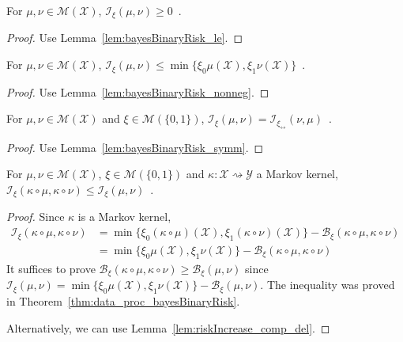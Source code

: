 \begin{lemma}
  \label{lem:statInfo_nonneg}
  For $\mu, \nu \in \mathcal M(\mathcal X)$, $\mathcal I_\xi(\mu, \nu) \ge 0$~.
\end{lemma}

\begin{proof}%
{}
Use Lemma~\ref{lem:bayesBinaryRisk_le}.
\end{proof}


\begin{lemma}
  \label{lem:statInfo_le}
  \leanok
  For $\mu, \nu \in \mathcal M(\mathcal X)$, $\mathcal I_\xi(\mu, \nu) \le \min\{\xi_0 \mu(\mathcal X), \xi_1 \nu(\mathcal X)\}$~.
\end{lemma}

\begin{proof}\leanok
{}
Use Lemma~\ref{lem:bayesBinaryRisk_nonneg}.
\end{proof}


\begin{lemma}
  \label{lem:statInfo_symm}
  \leanok
  For $\mu, \nu \in \mathcal M(\mathcal X)$ and $\xi \in \mathcal M(\{0,1\})$, $\mathcal I_\xi(\mu, \nu) = \mathcal I_{\xi_\leftrightarrow}(\nu, \mu)$~.
\end{lemma}

\begin{proof}\leanok
{}
Use Lemma~\ref{lem:bayesBinaryRisk_symm}.
\end{proof}

\begin{theorem}
  \label{thm:data_proc_statInfo}
  \leanok
  For $\mu, \nu \in \mathcal M(\mathcal X)$, $\xi \in \mathcal M(\{0,1\})$ and $\kappa : \mathcal X \rightsquigarrow \mathcal Y$ a Markov kernel, $\mathcal I_\xi(\kappa \circ \mu, \kappa \circ \nu) \le \mathcal I_\xi(\mu, \nu)$~.
\end{theorem}

\begin{proof}\leanok
{}
Since $\kappa$ is a Markov kernel,
\begin{align*}
\mathcal I_\xi(\kappa \circ \mu, \kappa \circ \nu)
&= \min\{\xi_0(\kappa \circ \mu)(\mathcal X), \xi_1(\kappa \circ \nu)(\mathcal X)\} - \mathcal B_\xi(\kappa \circ \mu, \kappa \circ \nu)
\\
&= \min\{\xi_0 \mu(\mathcal X), \xi_1 \nu(\mathcal X)\} - \mathcal B_\xi(\kappa \circ \mu, \kappa \circ \nu)
\end{align*}
It suffices to prove $\mathcal B_\xi(\kappa \circ \mu, \kappa \circ \nu) \ge \mathcal B_\xi(\mu, \nu)$ since $\mathcal I_\xi(\mu, \nu) = \min\{\xi_0\mu(\mathcal X), \xi_1\nu(\mathcal X)\} - \mathcal B_\xi(\mu, \nu)$.
The inequality was proved in Theorem~\ref{thm:data_proc_bayesBinaryRisk}.

Alternatively, we can use Lemma~\ref{lem:riskIncrease_comp_del}.
\end{proof}


